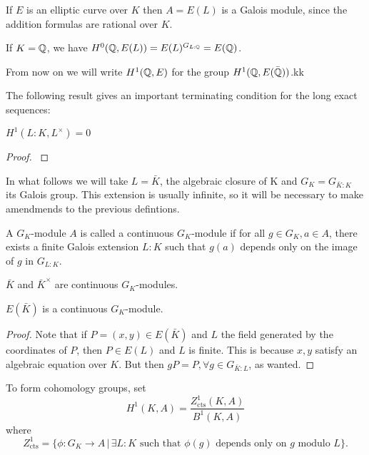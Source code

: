 \documentclass[12pt, a4paper]{amsart}
\begin{document}
\begin{example}
  If $E$ is an elliptic curve over $K$ then $A = E(L)$ is a Galois module,
  since the addition formulas are rational over $K$.

  If $K = {\mathbb Q}$, we have $H^0({\mathbb Q},E(L)) = E(L)^{G_{L:{\mathbb Q}}} = E({\mathbb Q})$.
\end{example}

From now on we will write $H^1({\mathbb Q}, E)$ for the group $H^1({\mathbb Q}, E(\bar{{\mathbb Q}}))$.kk

The following result gives an important terminating condition for the
long exact sequences:

\begin{thm}
  $  H^1(L : K, L^{\times}) = 0$
\end{thm}
\begin{proof}
  \cite[See][Chapter X, page 150]{cohomology}
\end{proof}

In what follows we will take $L = \bar{K}$, the algebraic closure of K and
$G_K = G_{\bar{K}:K}$ its Galois group. This extension is usually infinite, so
it will be necessary to make amendmends to the previous defintions.

\begin{defn}
  A $G_K$-module $A$ is called a continuous $G_K$-module if for all $g \in G_K, a \in A$,
  there exists a finite Galois extension $L:K$ such that $g(a)$
  depends only on the image of $g$ in $G_{L:K}$.
\end{defn}

\begin{example}
  $\bar{K}$ and $ \bar{K}^{\times}$ are continuous $G_K$-modules.
\end{example}

\begin{lemma}
  $E(\bar{K})$ is a continuous $G_K$-module.
\end{lemma}
\begin{proof}
  Note that if $P = (x,y) \in E(\bar{K})$ and $L$ the field generated
  by the coordinates of $P$, then $P \in E(L)$ and $L$ is finite. This is
  because $x, y$ satisfy an algebraic equation over $K$.
  But then $g P = P, \forall g \in G_{\bar{K} : L}$, as wanted.
\end{proof}
  
To form cohomology groups, set
\[H^1(K,A) = \frac{Z^1_{\text{cts}}(K,A)}{B^1(K,A)}\]
where
\[Z^1_{\text{cts}} = \{\phi : G_K \rightarrow A \, | \, \exists L : K
  \text{ such that } \phi(g) \text{ depends only on } g \text{ modulo } L\}.\]
\end{document}
